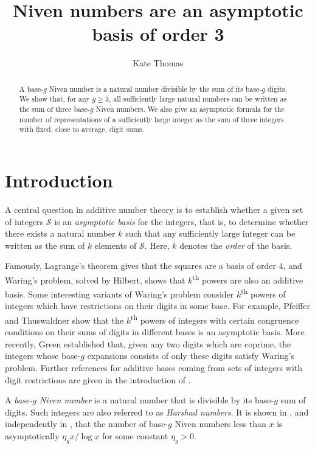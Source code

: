 \documentclass[hidelinks,11pt,reqno]{amsart}
\title{Niven numbers are an asymptotic basis of order 3}
\author{Kate Thomas}
\renewcommand{\geq}{\geqslant}
\newcommand{\sth}{\textsuperscript{th }}
\theoremstyle{remark}
\begin{document}
\begin{abstract}
    A base-$g$ Niven number is a natural number divisible by the sum of its base-$g$ digits. We show that, for any $g\geq 3$, all sufficiently large natural numbers can be written as the sum of three base-$g$ Niven numbers. We also give an asymptotic formula for the number of representations of a sufficiently large integer as the sum of three integers with fixed, close to average, digit sums.
\end{abstract}

\maketitle
\tableofcontents
\section{Introduction}
A central question in additive number theory is to establish whether a given set of integers $\mathcal{S}$ is an \emph{asymptotic basis} for the integers, that is, to determine whether there exists a natural number $k$ such that any sufficiently large integer can be written as the sum of $k$ elements of $\mathcal{S}$. Here, $k$ denotes the \textit{order} of the basis.

Famously, Lagrange's theorem gives that the squares are a basis of order 4, and Waring's problem, solved by Hilbert, shows that $k$\sth powers are also an additive basis. Some interesting variants of Waring's problem consider $k$\sth powers of integers which have restrictions on their digits in some base. For example, Pfeiffer and Thuswaldner \cite{pfeiffer2007waring} show that the $k$\sth powers of integers with certain congruence conditions on their sums of digits in different bases is an asymptotic basis. More recently, Green \cite{green2025waring} established that, given any two digits which are coprime, the integers whose base-$g$ expansions consists of only these digits satisfy Waring's problem. Further references for additive bases coming from sets of integers with digit restrictions are given in the introduction of \cite{sanna2021additive}.

A \emph{base-$g$ Niven number} is a natural number that is divisible by its base-$g$ sum of digits. Such integers are also referred to as \textit{Harshad numbers}. It is shown in \cite{de2003counting}, and independently in \cite{mauduit2005distribution}, that the number of base-$g$ Niven numbers less than $x$ is asymptotically $\eta_{g}x/\log x$ for some constant $\eta_g>0$. 
\end{document}
